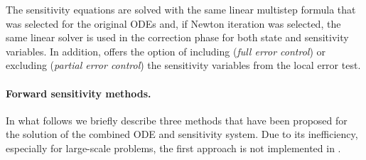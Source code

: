 The sensitivity equations are solved with the same linear multistep formula that
was selected for the original ODEs and, if Newton iteration was selected, the
same linear solver is used in the correction phase for both state and sensitivity 
variables. In addition, {\cvodes} offers the option of including 
({\em full error control}) or excluding
({\em partial error control}) the sensitivity variables from the local 
error test.

\paragraph{Forward sensitivity methods.}
In what follows we briefly describe three methods that have been proposed for the 
solution of the combined ODE and sensitivity system. Due to its inefficiency, 
especially for large-scale problems, the first approach is not implemented in {\cvodes}.

